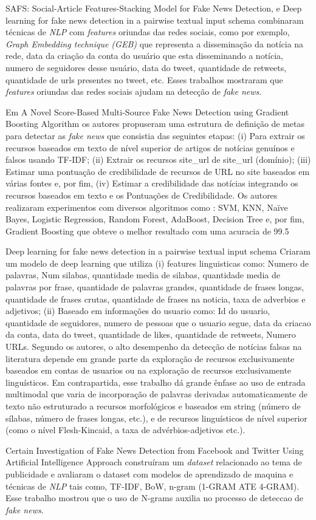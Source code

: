\cite{} SAFS: Social-Article Features-Stacking Model for Fake News Detection, e \cite{} Deep learning for fake news detection in a pairwise textual input schema combinaram técnicas de \textit{NLP} com \textit{features} oriundas das redes sociais, como por exemplo, \textit{Graph Embedding technique (GEB)} que representa a disseminação da notícia na rede, data da criação da conta do usuário que esta disseminando a notícia, numero de seguidores desse usuário, data do tweet, quantidade de retweets, quantidade de urls presentes no tweet, etc. Esses trabalhos mostraram que \textit{features} oriundas das redes sociais ajudam na detecção de \textit{fake news}.

Em \cite{} A Novel Score-Based Multi-Source Fake News Detection using Gradient Boosting Algorithm os autores propuseram uma estrutura de definição de metas para detectar as \textit{fake news} que consistia das seguintes etapas: (i) Para extrair os recursos baseados em texto de nível superior de artigos de notícias genuínos e falsos usando TF-IDF; (ii) Extrair os recursos site\_url de site\_url (domínio); (iii) Estimar uma pontuação de credibilidade de recursos de URL no site baseados em várias fontes e, por fim, (iv) Estimar a credibilidade das notícias integrando os recursos baseados em texto e os Pontuações de Credibilidade. Os autores realizaram experimentos com diversos algoritmos como : SVM, KNN, Naïve Bayes, Logistic Regression, Random Forest, AdaBoost, Decision Tree e, por fim, Gradient Boosting que obteve o melhor resultado com uma acuracia de 99.5%

\cite{}Deep learning for fake news detection in a pairwise textual input schema  Criaram um modelo de deep learning que utiliza (i) features linguisticas como: Numero de palavras, Num silabas, quantidade media de silabas, quantidade media de palavras por frase, quantidade de palavras grandes, quantidade de frases longas, quantidade de frases crutas, quantidade de frases na noticia, taxa de adverbios e adjetivos; (ii) Baseado em informações do usuario como: Id do usuario, quantidade de seguidores, numero de pessoas que o usuario segue, data da criacao da conta, data do tweet, quantidade de likes, quantidade de retweets, Numero URLs. Segundo os autores, o alto desempenho da detecção de notícias falsas na literatura depende em grande parte da exploração de recursos exclusivamente baseados em contas de usuarios ou na exploração de recursos exclusivamente linguísticos. Em contrapartida, esse trabalho dá grande ênfase ao uso de entrada multimodal que varia de incorporação de palavras derivadas automaticamente de texto não estruturado a recursos morfológicos e baseados em string (número de sílabas, número de frases longas, etc.), e de recursos linguísticos de nível superior (como o nível Flesh-Kincaid, a taxa de advérbios-adjetivos etc.).

\cite{} Certain Investigation of Fake News Detection from Facebook and Twitter Using Artificial Intelligence Approach construíram um \textit{dataset} relacionado ao tema de publicidade e avaliaram o dataset com modelos de aprendizado de maquina e técnicas de \textit{NLP} tais como, TF-IDF, BoW, n-gram (1-GRAM ATE 4-GRAM). Esse trabalho mostrou que o uso de N-grams auxilia no processo de deteccao de \textit{fake news}.